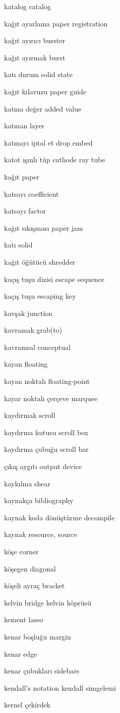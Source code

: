 \documentclass[12pt,fleqn]{article}\usepackage{../../common}
\begin{document}
katalog catalog

kağıt ayarlama paper registration

kağıt ayırıcı burster

kağıt ayırmak burst

katı durum solid state

kağıt kılavuzu paper guide

katma değer added value

katman layer

katmayı iptal et drop embed

katot ışınlı tüp cathode ray tube

kağıt paper

katsayı coefficient

katsayı factor

kağıt sıkışması paper jam

katı solid

kağıt öğütücü shredder

kaçış tuşu dizisi escape sequence

kaçış tuşu escaping key

kavşak junction

kavramak grab(to)

kavramsal conceptual

kayan floating

kayan noktalı floating-point

kayar noktalı çerçeve marquee

kaydırmak scroll

kaydırma kutusu scroll box

kaydırma çubuğu scroll bar

çıkış aygıtı output device

kaykılma shear

kaynakça bibliography

kaynak koda dönüştürme decompile

kaynak resource, source

köşe corner

köşegen diagonal

köşeli ayraç bracket

kelvin bridge kelvin köprüsü

kement lasso

kenar boşluğu margin

kenar edge

kenar çubukları sidebars

kendall's notation kendall simgelemi

kernel çekirdek
\end{document}
